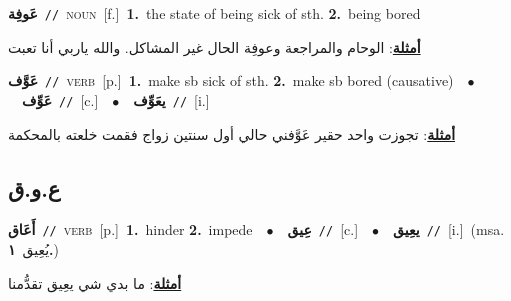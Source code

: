 \documentclass[10pt,a4paper,twoside]{article} %
\begin{document}
\begin{multicols}{2}
{\setlength\topsep{0pt}\textbf{\foreignlanguage{arabic}{عَوفِة}}\ {\color{gray}\texttt{//}\color{black}}\ \textsc{noun}\ [f.]\ \textbf{1.}~the state of being sick of sth.  \textbf{2.}~being bored\  \begin{flushright}\color{gray}\foreignlanguage{arabic}{\textbf{\underline{\foreignlanguage{arabic}{أمثلة}}}: الوحام والمراجعة وعوفِة الحال غير المشاكل. والله ياربي أنا تعبت}\end{flushright}\color{black}} \vspace{2mm}

{\setlength\topsep{0pt}\textbf{\foreignlanguage{arabic}{عَوَّف}}\ {\color{gray}\texttt{//}\color{black}}\ \textsc{verb}\ [p.]\ \textbf{1.}~make sb sick of sth.  \textbf{2.}~make sb bored (causative)\ \ $\bullet$\ \ \setlength\topsep{0pt}\textbf{\foreignlanguage{arabic}{عَوِّف}}\ {\color{gray}\texttt{//}\color{black}}\ [c.]\ \ $\bullet$\ \ \setlength\topsep{0pt}\textbf{\foreignlanguage{arabic}{يعَوِّف}}\ {\color{gray}\texttt{//}\color{black}}\ [i.]\  \begin{flushright}\color{gray}\foreignlanguage{arabic}{\textbf{\underline{\foreignlanguage{arabic}{أمثلة}}}: تجوزت واحد حقير عَوَّفني حالي أول سنتين زواج فقمت خلعته بالمحكمة}\end{flushright}\color{black}} \vspace{2mm}

\vspace{-3mm}
\subsection*{\color{blue}\foreignlanguage{arabic}{ع.و.ق}\color{blue}{}} 

{\setlength\topsep{0pt}\textbf{\foreignlanguage{arabic}{أَعَاق}}\ {\color{gray}\texttt{//}\color{black}}\ \textsc{verb}\ [p.]\ \textbf{1.}~hinder  \textbf{2.}~impede\ \ $\bullet$\ \ \setlength\topsep{0pt}\textbf{\foreignlanguage{arabic}{عِيق}}\ {\color{gray}\texttt{//}\color{black}}\ [c.]\ \ $\bullet$\ \ \setlength\topsep{0pt}\textbf{\foreignlanguage{arabic}{يعِيق}}\ {\color{gray}\texttt{//}\color{black}}\ [i.]\ \color{gray}(msa. \foreignlanguage{arabic}{يُعِيق}~\foreignlanguage{arabic}{\textbf{١.}})\color{black}\  \begin{flushright}\color{gray}\foreignlanguage{arabic}{\textbf{\underline{\foreignlanguage{arabic}{أمثلة}}}: ما بدي شي يعِيق تقدُّمنا}\end{flushright}\color{black}} \vspace{2mm}


\end{multicols}
\end{document}
